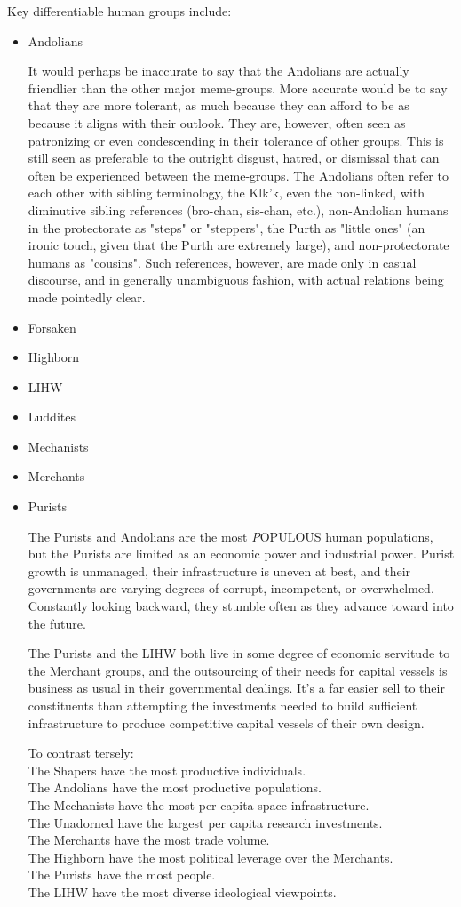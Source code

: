 Key differentiable human groups include:
\begin{itemize}
\item Andolians

It would perhaps be inaccurate to say that the Andolians are actually
friendlier than the other major meme-groups. More accurate would be to
say that they are more tolerant, as much because they can afford to be
as because it aligns with their outlook. They are, however, often seen
as patronizing or even condescending in their tolerance of other
groups. This is still seen as preferable to the outright disgust,
hatred, or dismissal that can often be experienced between the
meme-groups. The Andolians often refer to each other with sibling
terminology, the Klk'k, even the non-linked, with diminutive sibling
references (bro-chan, sis-chan, etc.), non-Andolian humans in the
protectorate as "steps" or "steppers", the Purth as "little ones" (an
ironic touch, given that the Purth are extremely large), and
non-protectorate humans as "cousins". Such references, however, are
made only in casual discourse, and in generally unambiguous fashion,
with actual relations being made pointedly clear.

\item Forsaken
\item Highborn
\item LIHW
\item Luddites
\item Mechanists
\item Merchants
\item Purists

The Purists and Andolians are the most {\emph POPULOUS} human
populations, but the Purists are limited as an economic power and
industrial power. Purist growth is unmanaged, their infrastructure is
uneven at best, and their governments are varying degrees of corrupt,
incompetent, or overwhelmed. Constantly looking backward, they stumble
often as they advance toward into the future.

The Purists and the LIHW both live in some degree of economic
servitude to the Merchant groups, and the outsourcing of their needs
for capital vessels is business as usual in their governmental
dealings. It's a far easier sell to their constituents than attempting
the investments needed to build sufficient infrastructure to produce
competitive capital vessels of their own design.

To contrast tersely:\\
The Shapers have the most productive individuals.\\
The Andolians have the most productive populations.\\
The Mechanists have the most per capita space-infrastructure.\\
The Unadorned have the largest per capita research investments.\\
The Merchants have the most trade volume.\\
The Highborn have the most political leverage over the Merchants.\\
The Purists have the most people.\\
The LIHW have the most diverse ideological viewpoints.\\


\end{itemize}
